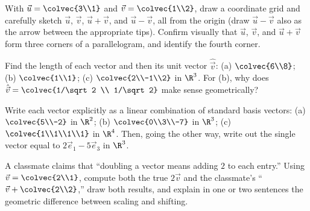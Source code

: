 \begin{exercise}
\label{ch02:exr-parallelogram}
With $\vec{u}=\colvec{3\\1}$ and $\vec{v}=\colvec{1\\2}$, draw a coordinate grid and
carefully sketch $\vec{u}$, $\vec{v}$, $\vec{u}+\vec{v}$, and $\vec{u}-\vec{v}$, all from
the origin (draw $\vec{u}-\vec{v}$ also as the arrow between the appropriate tips). Confirm
visually that $\vec{u}$, $\vec{v}$, and $\vec{u}+\vec{v}$ form three corners of a
parallelogram, and identify the fourth corner.
\end{exercise}

\begin{exercise}[Normalizing]
\label{ch02:exr-normalize}
Find the length of each vector and then its unit vector $\hat{\vec{v}}$:
(a) $\colvec{6\\8}$; \quad
(b) $\colvec{1\\1}$; \quad
(c) $\colvec{2\\-1\\2}$ in $\R^3$.
For (b), why does $\hat{\vec{v}}=\colvec{1/\sqrt2 \\ 1/\sqrt2}$ make sense geometrically?
\end{exercise}

\begin{exercise}
\label{ch02:exr-basis}
Write each vector explicitly as a linear combination of standard basis vectors:
(a) $\colvec{5\\-2}$ in $\R^2$; \quad
(b) $\colvec{0\\3\\-7}$ in $\R^3$; \quad
(c) $\colvec{1\\1\\1\\1}$ in $\R^4$.
Then, going the other way, write out the single vector equal to
$2\vec{e}_1 - 5\vec{e}_3$ in $\R^3$.
\end{exercise}

\begin{exercise}
\label{ch02:exr-trap}
A classmate claims that ``doubling a vector means adding $2$ to each entry.'' Using
$\vec{v}=\colvec{2\\1}$, compute both the true $2\vec{v}$ and the classmate's
``$\vec{v}+\colvec{2\\2}$,'' draw both results, and explain in one or two sentences the
geometric difference between scaling and shifting.
\end{exercise}

